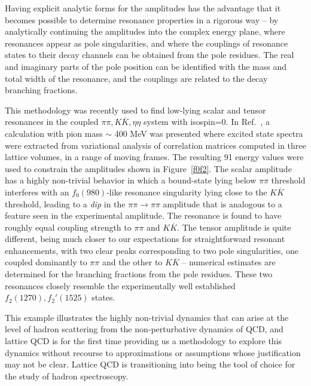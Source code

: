 Having explicit analytic forms for the amplitudes has the advantage that it becomes possible to determine resonance properties in a rigorous way -- by analytically continuing the amplitudes into the complex energy plane, where resonances appear as pole singularities, and where the couplings of resonance states to their decay channels can be obtained from the pole residues. The real and imaginary parts of the pole position can be identified with the mass and total width of the resonance, and the couplings are related to the decay branching fractions.

This methodology was recently used to find low-lying scalar and tensor resonances in the coupled $\pi\pi, K\overline{K}, \eta\eta$ system with isospin=0. In Ref.~\cite{Briceno:2017qmb}, a calculation with pion mass $\sim$ 400 MeV was presented where excited state spectra were extracted from variational analysis of correlation matrices computed in three lattice volumes, in a range of moving frames. The resulting 91 energy values were used to constrain the amplitudes shown in Figure~\ref{f0f2}. The scalar amplitude has a highly non-trivial behavior in which a bound-state lying below $\pi\pi$ threshold interferes with an $f_0(980)$-like resonance singularity lying close to the $K\overline{K}$ threshold, leading to a \emph{dip} in the $\pi\pi \to \pi \pi$ amplitude that is analogous to a feature seen in the experimental amplitude. The resonance is found to have roughly equal coupling strength to $\pi\pi$ and $K\overline{K}$. The tensor amplitude is quite different, being much closer to our expectations for straightforward resonant enhancements, with two clear peaks corresponding to two pole singularities, one coupled dominantly to $\pi\pi$ and the other to $K\overline{K}$ -- numerical estimates are determined for the branching fractions from the pole residues. These two resonances closely resemble the experimentally well established $f_2(1270), f_2'(1525)$ states.

This example illustrates the highly non-trivial dynamics that can arise at the level of hadron scattering from the non-perturbative dynamics of QCD, and lattice QCD is for the first time providing us a methodology to explore this dynamics without recourse to approximations or assumptions whose justification may not be clear. Lattice QCD is transitioning into being the tool of choice for the study of hadron spectroscopy.


